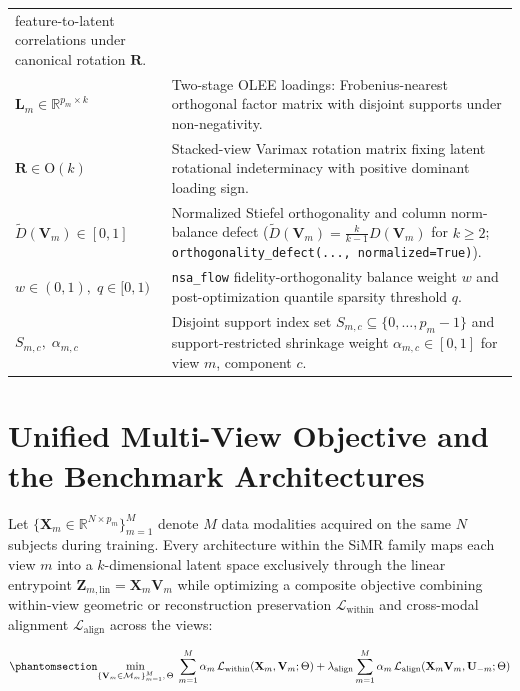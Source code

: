 \documentclass[
  10pt,
  letterpaper,
]{report}
\begin{document}
\begin{longtable}[]{@{}
  >{\raggedright\arraybackslash}p{}
  >{\raggedright\arraybackslash}p{}@{}}
feature-to-latent correlations under canonical rotation
\(\mathbf{R}\). \\
\(\mathbf{L}_m \in \mathbb{R}^{p_m \times k}\) & Two-stage OLEE
loadings: Frobenius-nearest orthogonal factor matrix with disjoint
supports under non-negativity. \\
\(\mathbf{R} \in \mathrm{O}(k)\) & Stacked-view Varimax rotation matrix
fixing latent rotational indeterminacy with positive dominant loading
sign. \\
\(\tilde{D}(\mathbf{V}_m) \in [0, 1]\) & Normalized Stiefel
orthogonality and column norm-balance defect
(\(\tilde{D}(\mathbf{V}_m) = \frac{k}{k-1} D(\mathbf{V}_m)\) for
\(k \ge 2\); \texttt{orthogonality\_defect(...,\ normalized=True)}). \\
\(w \in (0,1), \; q \in [0,1)\) & \texttt{nsa\_flow}
fidelity-orthogonality balance weight \(w\) and post-optimization
quantile sparsity threshold \(q\). \\
\(S_{m,c}, \; \alpha_{m,c}\) & Disjoint support index set
\(S_{m,c} \subseteq \{0, \dots, p_m - 1\}\) and support-restricted
shrinkage weight \(\alpha_{m,c} \in [0, 1]\) for view \(m\), component
\(c\). \\
\end{longtable}

\section{Unified Multi-View Objective and the Benchmark
Architectures}\label{unified-multi-view-objective-and-the-benchmark-architectures}

Let \(\{\mathbf{X}_m \in \mathbb{R}^{N \times p_m}\}_{m=1}^M\) denote
\(M\) data modalities acquired on the same \(N\) subjects during
training. Every architecture within the SiMR family maps each view \(m\)
into a \(k\)-dimensional latent space exclusively through the linear
entrypoint \(\mathbf{Z}_{m,\text{lin}} = \mathbf{X}_m \mathbf{V}_m\)
while optimizing a composite objective combining within-view geometric
or reconstruction preservation \(\mathcal{L}_{\text{within}}\) and
cross-modal alignment \(\mathcal{L}_{\text{align}}\) across the views:

\begin{equation}\protect\phantomsection\label{eq-unified-simr}{
\min_{\{\mathbf{V}_m \in \mathcal{M}_m\}_{m=1}^M, \, \Theta} \; \sum_{m=1}^M \alpha_m \, \mathcal{L}_{\text{within}}(\mathbf{X}_m, \mathbf{V}_m; \Theta) + \lambda_{\text{align}} \sum_{m=1}^M \alpha_m \, \mathcal{L}_{\text{align}}\!\left(\mathbf{X}_m \mathbf{V}_m, \mathbf{U}_{-m}; \Theta\right)
}\end{equation}
\end{document}
